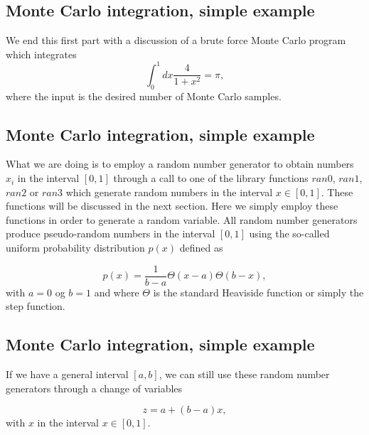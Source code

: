 \documentclass[%
oneside,                 %
final,                   %
10pt]{article}
\newenvironment{block_mdfboxadmon}[1][]{
\begin{block_mdfboxmdframed}[frametitle=#1]
}
{
\end{block_mdfboxmdframed}
}
\begin{document}
\subsection{Monte Carlo integration, simple  example}

\begin{block_mdfboxadmon}[]
We end this first part with a discussion of 
a brute force Monte Carlo program which integrates
\begin{equation*}
   \int_0^1dx\frac{4}{1+x^2} = \pi,
\end{equation*}
where the input is the desired number of Monte Carlo samples.
\end{block_mdfboxadmon} %



\subsection{Monte Carlo integration, simple  example}

\begin{block_mdfboxadmon}[]
What we are doing is to employ a random number generator to obtain numbers
$x_i$ in the interval $[0,1]$ through a call to one of the 
library functions
$ran0$, $ran1$, $ran2$ or $ran3$ which generate random numbers in the 
interval $x\in [0,1]$. 
These functions will be discussed in the next section. 
Here we simply employ these functions in order
to generate a random variable.
All random number generators produce pseudo-random  
numbers in the interval $[0,1]$ using the so-called uniform
probability distribution  
$p(x)$ defined as

\begin{equation*}
  p(x)=\frac{1}{b-a}\Theta(x-a)\Theta(b-x),
\end{equation*}
with  $a=0$ og $b=1$ and where $\Theta$ is the standard Heaviside 
function or simply the step function.
\end{block_mdfboxadmon} %




\subsection{Monte Carlo integration, simple  example}

\begin{block_mdfboxadmon}[]
If we have a general  interval  $[a,b]$, we can still
use these random number generators through a change of variables

\begin{equation*}
   z=a+(b-a)x,
\end{equation*}
with $x$ in the interval  $x\in [0,1]$.
\end{block_mdfboxadmon} %
\end{document}
